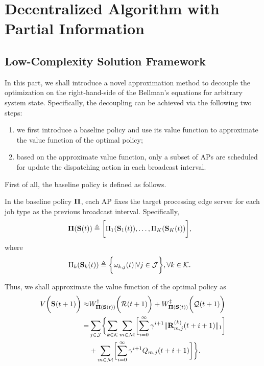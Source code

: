 \section{Decentralized Algorithm with Partial Information}
\label{sec:algorithm}

\subsection{Low-Complexity Solution Framework}
In this part, we shall introduce a novel approximation method to decouple the optimization on the right-hand-side of the Bellman's equations for arbitrary system state.
Specifically, the decoupling can be achieved via the following two steps:
\begin{enumerate}
    \item we first introduce a baseline policy and use its value function to approximate the value function of the optimal policy;
    \item based on the approximate value function, only a {subset of APs} are scheduled for update the dispatching action in each broadcast interval.
\end{enumerate}
First of all, the baseline policy is defined as follows.
\begin{definition}
    In the baseline policy $\boldsymbol{\Pi}$, each AP fixes the target processing edge server for each job type as the previous broadcast interval. Specifically,
    \begin{align}
        \boldsymbol{\Pi}(\mathbf{S}(t)) &\triangleq \bigg[ \Pi_{1}(\mathbf{S}_{1}(t)), \dots, \Pi_{K}(\mathbf{S}_{K}(t)) \bigg],
    \end{align}
    where 
    \begin{align}
        \Pi_{k}(\mathbf{S}_{k}(t)) &\triangleq \bigg\{
            \omega_{k,j}(t) | \forall j\in\mathcal{J}
        \bigg\}, \forall k\in\mathcal{K}.
    \end{align}
\end{definition}

Thus, we shall approximate the value function of the optimal policy as
\begin{align}
    V\Paren{\Stat(t+1)} \approx& W^{\dagger}_{\Baseline(\Stat(t))} \Paren{\mathcal{R}(t+1)} + W^{\ddagger}_{\Baseline(\Stat(t))}\Paren{\mathcal{Q}(t+1)}
    \nonumber\\
    =& \sum_{j\in\jSpace}\Brace{
        \sum_{k\in\apSet}\sum_{m\in\esSet}\Bracket{ \sum_{i=0}^{\infty} \gamma^{i+1} \Inorm{\vec{R}^{(k)}_{m,j}(t+i+1)} }
        \nonumber\\
        & + \sum_{m\in\esSet} \Bracket{ \sum_{i=0}^{\infty} \gamma^{i+1} Q_{m,j}(t+i+1) }
    }.
\end{align}

